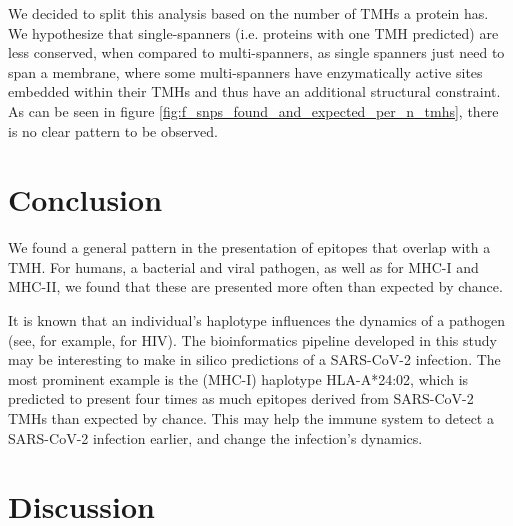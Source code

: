 We decided to split this analysis based on the number of TMHs
a protein has. We hypothesize that single-spanners (i.e. proteins
with one TMH predicted) are less conserved, when compared to multi-spanners,
as single spanners just need to span a membrane, where some multi-spanners
have enzymatically active sites embedded within their TMHs and thus
have an additional structural constraint.
As can be seen in figure \ref{fig:f_snps_found_and_expected_per_n_tmhs}, 
there is no clear pattern to be observed.

\section{Conclusion}


We found a general pattern in the
presentation of epitopes that overlap with a TMH.
For humans, a bacterial and viral pathogen,
as well as for MHC-I and MHC-II,
we found that these are presented more often 
than expected by chance.


It is known that an individual's haplotype
influences the dynamics of a pathogen (see,
for example, \cite{eccleston2017host} for HIV).
The bioinformatics pipeline developed in this
study may be interesting to make in silico
predictions of a SARS-CoV-2 infection.
The most prominent example is the (MHC-I)
haplotype HLA-A*24:02,
which is predicted to present four times as much epitopes derived 
from SARS-CoV-2 TMHs than expected by chance.
This may help the immune system to detect a SARS-CoV-2 infection earlier,
and change the infection's dynamics.

\section{Discussion}

